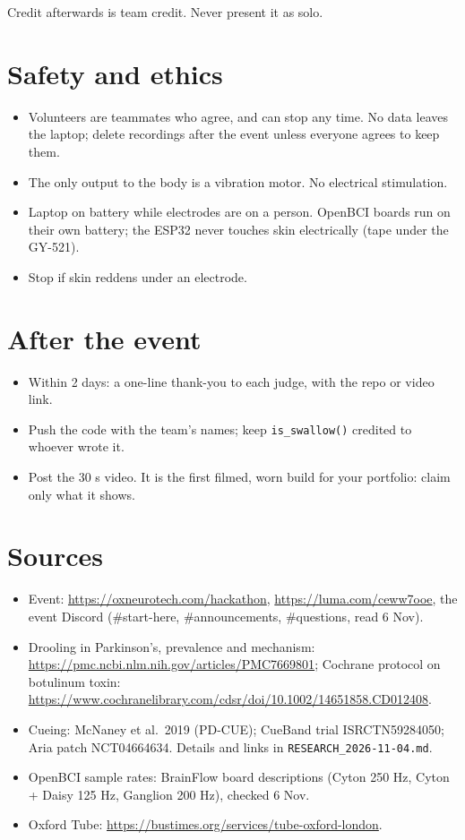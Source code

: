 \documentclass[10.5pt,a4paper]{article}
\newcommand{\f}[1]{\texttt{#1}}
\begin{document}
Credit afterwards is team credit. Never present it as solo.

\section{Safety and ethics}
\begin{itemize}
\item Volunteers are teammates who agree, and can stop any time. No data leaves the laptop; delete recordings after the event unless everyone agrees to keep them.
\item The only output to the body is a vibration motor. No electrical stimulation.
\item Laptop on battery while electrodes are on a person. OpenBCI boards run on their own battery; the ESP32 never touches skin electrically (tape under the GY-521).
\item Stop if skin reddens under an electrode.
\end{itemize}

\section{After the event}
\begin{itemize}
\item Within 2 days: a one-line thank-you to each judge, with the repo or video link.
\item Push the code with the team's names; keep \f{is\_swallow()} credited to whoever wrote it.
\item Post the 30 s video. It is the first filmed, worn build for your portfolio: claim only what it shows.
\end{itemize}

\section{Sources}
\small
\begin{itemize}
\item Event: \url{https://oxneurotech.com/hackathon}, \url{https://luma.com/ceww7ooe}, the event Discord (\#start-here, \#announcements, \#questions, read 6 Nov).
\item Drooling in Parkinson's, prevalence and mechanism: \url{https://pmc.ncbi.nlm.nih.gov/articles/PMC7669801}; Cochrane protocol on botulinum toxin: \url{https://www.cochranelibrary.com/cdsr/doi/10.1002/14651858.CD012408}.
\item Cueing: McNaney et al.\ 2019 (PD-CUE); CueBand trial ISRCTN59284050; Aria patch NCT04664634. Details and links in \f{RESEARCH\_2026-11-04.md}.
\item OpenBCI sample rates: BrainFlow board descriptions (Cyton 250 Hz, Cyton + Daisy 125 Hz, Ganglion 200 Hz), checked 6 Nov.
\item Oxford Tube: \url{https://bustimes.org/services/tube-oxford-london}.
\end{itemize}
\end{document}
